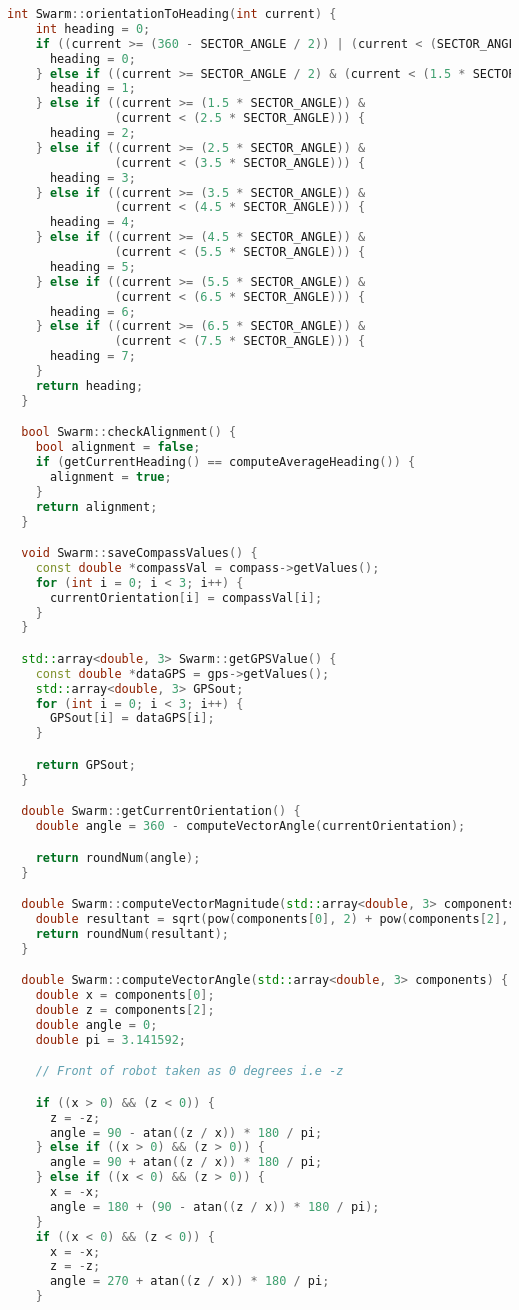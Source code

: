 \begin{lstlisting}[language=C++, caption={swarm.cpp},label={lst:swarm-header}]
  int Swarm::orientationToHeading(int current) {
    int heading = 0;
    if ((current >= (360 - SECTOR_ANGLE / 2)) | (current < (SECTOR_ANGLE / 2))) {
      heading = 0;
    } else if ((current >= SECTOR_ANGLE / 2) & (current < (1.5 * SECTOR_ANGLE))) {
      heading = 1;
    } else if ((current >= (1.5 * SECTOR_ANGLE)) &
               (current < (2.5 * SECTOR_ANGLE))) {
      heading = 2;
    } else if ((current >= (2.5 * SECTOR_ANGLE)) &
               (current < (3.5 * SECTOR_ANGLE))) {
      heading = 3;
    } else if ((current >= (3.5 * SECTOR_ANGLE)) &
               (current < (4.5 * SECTOR_ANGLE))) {
      heading = 4;
    } else if ((current >= (4.5 * SECTOR_ANGLE)) &
               (current < (5.5 * SECTOR_ANGLE))) {
      heading = 5;
    } else if ((current >= (5.5 * SECTOR_ANGLE)) &
               (current < (6.5 * SECTOR_ANGLE))) {
      heading = 6;
    } else if ((current >= (6.5 * SECTOR_ANGLE)) &
               (current < (7.5 * SECTOR_ANGLE))) {
      heading = 7;
    }
    return heading;
  }

  bool Swarm::checkAlignment() {
    bool alignment = false;
    if (getCurrentHeading() == computeAverageHeading()) {
      alignment = true;
    }
    return alignment;
  }

  void Swarm::saveCompassValues() {
    const double *compassVal = compass->getValues();
    for (int i = 0; i < 3; i++) {
      currentOrientation[i] = compassVal[i];
    }
  }

  std::array<double, 3> Swarm::getGPSValue() {
    const double *dataGPS = gps->getValues();
    std::array<double, 3> GPSout;
    for (int i = 0; i < 3; i++) {
      GPSout[i] = dataGPS[i];
    }

    return GPSout;
  }

  double Swarm::getCurrentOrientation() {
    double angle = 360 - computeVectorAngle(currentOrientation);

    return roundNum(angle);
  }

  double Swarm::computeVectorMagnitude(std::array<double, 3> components) {
    double resultant = sqrt(pow(components[0], 2) + pow(components[2], 2));
    return roundNum(resultant);
  }

  double Swarm::computeVectorAngle(std::array<double, 3> components) {
    double x = components[0];
    double z = components[2];
    double angle = 0;
    double pi = 3.141592;

    // Front of robot taken as 0 degrees i.e -z

    if ((x > 0) && (z < 0)) {
      z = -z;
      angle = 90 - atan((z / x)) * 180 / pi;
    } else if ((x > 0) && (z > 0)) {
      angle = 90 + atan((z / x)) * 180 / pi;
    } else if ((x < 0) && (z > 0)) {
      x = -x;
      angle = 180 + (90 - atan((z / x)) * 180 / pi);
    }
    if ((x < 0) && (z < 0)) {
      x = -x;
      z = -z;
      angle = 270 + atan((z / x)) * 180 / pi;
    }


\end{lstlisting}
